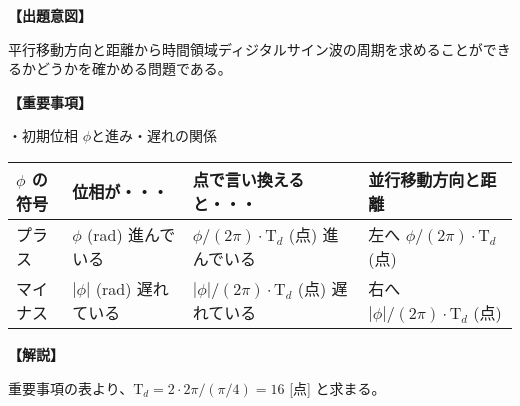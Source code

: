 \noindent \textbf{【出題意図】}

\bigskip
\noindent 平行移動方向と距離から時間領域ディジタルサイン波の周期を求めることができるかどうかを確かめる問題である。

\vspace{1em}
\noindent \textbf{【重要事項】}

\noindent ・初期位相 $\phi$と進み・遅れの関係

\medskip
\begin{center}
\small
\begin{tabularx}{0.9\fbwidth}{|X|X|X|X|}
\hline
$\phi$ の符号&  位相が・・・   & 点で言い換えると・・・   & 並行移動方向と距離 \\
\hline
プラス &  $\phi$ (rad) 進んでいる & $\phi/(2\pi) \cdot \textrm{T}_d$ (点) 進んでいる & 左へ $\phi/(2\pi) \cdot \textrm{T}_d$ (点) \\
\hline
マイナス &  $|\phi|$ (rad) 遅れている & $|\phi|/(2\pi) \cdot \textrm{T}_d$ (点) 遅れている & 右へ $|\phi|/(2\pi) \cdot \textrm{T}_d$ (点) \\
\hline
\end{tabularx}
\end{center}

\bigskip

\vspace{1em}
\noindent \textbf{【解説】}

\bigskip
\noindent 重要事項の表より、$\textrm{T}_d = 2 \cdot 2\pi / (\pi/4) = 16$ [点] と求まる。

